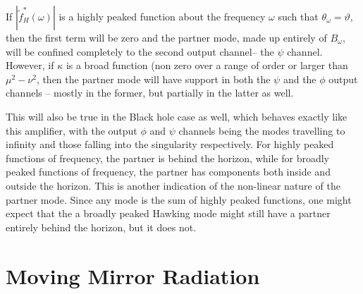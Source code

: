 \documentclass[aps,prd,showpacs,amssymb,nofootinbib,12pt]{revtex4-2}
\begin{document}
If $|\tilde f_H^*(\omega)|$ is a highly peaked function about the frequency 
$\omega$ such that $\theta_\omega=\vartheta$, then the first
term will be zero and the partner mode, made up entirely of $B_\omega$, will be
confined completely to the second output channel-- the $\psi$ channel.
However, if $\kappa$ is a broad function 
(non zero over a range of order or  larger than
$\mu^2-\nu^2$, then the partner mode will have support in both the $\psi$ and
the $\phi$ output channels -- mostly in the former, but partially in the latter
as well. 

This will also be true in the Black hole case as well, which behaves exactly
like this amplifier, with the output $\phi$ and $\psi$ channels being the
modes travelling to infinity and those falling into the singularity
respectively. For highly peaked functions of frequency, the partner is behind
the horizon, while for broadly peaked functions of frequency, the partner has
components both inside and outside the horizon. This is another indication of
the non-linear nature of the partner mode. Since any mode is the sum of highly
peaked functions, one might expect that the a broadly peaked Hawking mode
might still have a partner entirely behind the horizon, but it does not. 


\section{Moving Mirror Radiation}\label{Moving Mirror Radiation}
\end{document}
